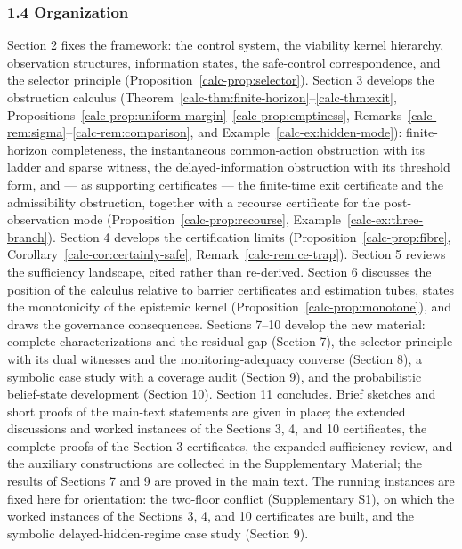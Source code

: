 \documentclass[10pt,twocolumn]{article}
\theoremstyle{definition}
\begin{document}
\subsubsection{1.4 Organization}\label{calc-organization}

Section 2 fixes the framework: the control system, the viability kernel
hierarchy, observation structures, information states, the safe-control
correspondence, and the selector principle (Proposition~\ref{calc-prop:selector}). Section 3 develops the obstruction calculus (Theorem~\ref{calc-thm:finite-horizon}--\ref{calc-thm:exit}, Propositions~\ref{calc-prop:uniform-margin}--\ref{calc-prop:emptiness}, Remarks~\ref{calc-rem:sigma}--\ref{calc-rem:comparison}, and Example~\ref{calc-ex:hidden-mode}): finite-horizon completeness, the instantaneous common-action obstruction with its ladder and sparse witness, the delayed-information obstruction with its threshold form, and --- as supporting certificates --- the finite-time exit certificate and the admissibility obstruction, together with a recourse certificate for the post-observation mode (Proposition~\ref{calc-prop:recourse}, Example~\ref{calc-ex:three-branch}). Section 4 develops the certification limits
(Proposition~\ref{calc-prop:fibre}, Corollary~\ref{calc-cor:certainly-safe}, Remark~\ref{calc-rem:ce-trap}). Section 5 reviews the sufficiency landscape, cited rather than re-derived. Section
6 discusses the position of the calculus relative to barrier
certificates and estimation tubes, states the monotonicity of the
epistemic kernel (Proposition~\ref{calc-prop:monotone}), and draws the governance
consequences. Sections 7--10 develop the new material: complete characterizations and the residual gap (Section 7), the selector principle with its dual witnesses and the monitoring-adequacy converse (Section 8), a symbolic case study with a coverage audit (Section 9), and the probabilistic belief-state development (Section 10). Section 11 concludes. Brief sketches and short proofs of the main-text statements are given in place; the extended discussions and worked instances of the Sections 3, 4, and 10 certificates, the complete proofs of the Section 3 certificates, the expanded sufficiency review, and the auxiliary constructions are collected in the Supplementary Material; the results of Sections 7 and 9 are proved in the main text. The running
instances are fixed here for orientation: the two-floor conflict
(Supplementary S1), on which the worked instances of the Sections 3, 4,
and 10 certificates are built, and the symbolic delayed-hidden-regime
case study (Section 9).
\end{document}
